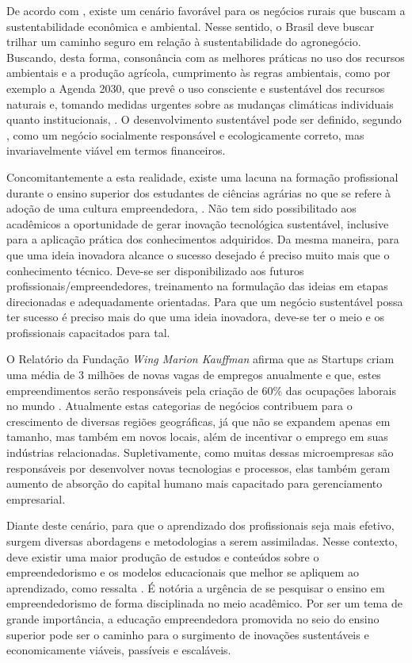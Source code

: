 De acordo com , existe um cenário favorável para os negócios rurais que buscam a sustentabilidade econômica e ambiental. Nesse sentido, o Brasil deve buscar trilhar um caminho seguro em relação à sustentabilidade do agronegócio. Buscando, desta forma, consonância com as melhores práticas no uso dos recursos ambientais e a produção agrícola, cumprimento às regras ambientais, como por exemplo a Agenda 2030, que prevê o uso consciente e sustentável dos recursos naturais e, tomando medidas urgentes sobre as mudanças climáticas individuais quanto institucionais, \cite{filho_documentos_2017}. O desenvolvimento sustentável pode ser definido, segundo \cite{lara_ideologia_2017}, como um negócio socialmente responsável e ecologicamente correto, mas invariavelmente viável em termos financeiros.


Concomitantemente a esta realidade, existe uma lacuna na formação profissional durante o ensino superior dos estudantes de ciências agrárias no que se refere à adoção de uma cultura empreendedora, \cite{araujo_educacao_2019}. Não tem sido possibilitado aos acadêmicos a oportunidade de gerar inovação tecnológica sustentável, inclusive para a aplicação prática dos conhecimentos adquiridos. Da mesma maneira, para que uma ideia inovadora alcance o sucesso desejado é preciso muito mais que o conhecimento técnico. Deve-se ser disponibilizado aos futuros profissionais/empreendedores, treinamento na formulação das ideias em etapas direcionadas e adequadamente orientadas. Para que um negócio sustentável possa ter sucesso é preciso mais do que uma ideia inovadora, deve-se ter o meio e os profissionais capacitados para tal. 


O Relatório da Fundação \textit{Wing Marion Kauffman} afirma que as Startups criam uma média de 3 milhões de novas vagas de empregos anualmente e que, estes empreendimentos serão responsáveis pela criação de 60\% das ocupações laborais no mundo \cite{brasil_o_2017}. Atualmente estas categorias de negócios contribuem para o crescimento de diversas regiões geográficas, já que não se expandem apenas em tamanho, mas também em novos locais, além de incentivar o emprego em suas indústrias relacionadas. Supletivamente, como muitas dessas microempresas são responsáveis por desenvolver novas tecnologias e processos, elas também geram aumento de absorção do capital humano mais capacitado para gerenciamento empresarial.


Diante deste cenário, para que o aprendizado dos profissionais seja mais efetivo, surgem diversas abordagens e metodologias a serem assimiladas. Nesse contexto, deve existir uma maior produção de estudos e conteúdos sobre o empreendedorismo e os modelos educacionais que melhor se apliquem ao aprendizado, como ressalta . É notória a urgência de se pesquisar o ensino em empreendedorismo de forma disciplinada no meio acadêmico. Por ser um tema de grande importância, a educação empreendedora promovida no seio do ensino superior pode ser o caminho para o surgimento de inovações sustentáveis e economicamente viáveis, passíveis e escaláveis.

